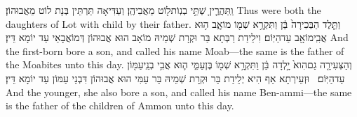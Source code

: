 {וַֽתַּהֲרֶ֛יןָ שְׁתֵּ֥י בְנֽוֹת\maqqaf ל֖וֹט מֵאֲבִיהֶֽן׃}
{וְעַדִּיאָה תַּרְתֵּין בְּנָת לוֹט מֵאֲבוּהוֹן׃}
{Thus were both the daughters of Lot with child by their father.}{}
{וַתֵּ֤לֶד הַבְּכִירָה֙ בֵּ֔ן וַתִּקְרָ֥א שְׁמ֖וֹ מוֹאָ֑ב ה֥וּא אֲבִֽי\maqqaf מוֹאָ֖ב עַד\maqqaf הַיּֽוֹם׃}
{וִילֵידַת רַבְּתָא בַּר וּקְרָת שְׁמֵיהּ מוֹאָב הוּא אֲבוּהוֹן דְּמוֹאֲבָאֵי עַד יוֹמָא דֵּין׃}
{And the first-born bore a son, and called his name Moab—the same is the father of the Moabites unto this day.}{}
{וְהַצְּעִירָ֤ה גַם\maqqaf הִוא֙ יָ֣לְדָה בֵּ֔ן וַתִּקְרָ֥א שְׁמ֖וֹ בֶּן\maqqaf עַמִּ֑י ה֛וּא אֲבִ֥י בְנֵֽי\maqqaf עַמּ֖וֹן עַד\maqqaf הַיּֽוֹם׃ \setuma }
{וּזְעֵירְתָא אַף הִיא יְלֵידַת בַּר וּקְרָת שְׁמֵיהּ בַּר עַמִּי הוּא אֲבוּהוֹן דִּבְנֵי עַמּוֹן עַד יוֹמָא דֵּין׃}
{And the younger, she also bore a son, and called his name Ben-ammi—the same is the father of the children of Ammon unto this day.}{}

